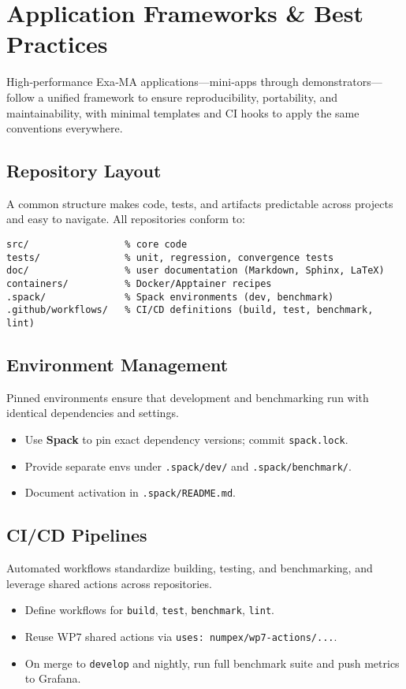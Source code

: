 
\section{Application Frameworks \& Best Practices}
\label{sec:apps-framework}

High‑performance Exa‑MA applications—mini‑apps through demonstrators—follow a unified framework to ensure reproducibility, portability, and maintainability, with minimal templates and CI hooks to apply the same conventions everywhere.

\subsection{Repository Layout}
A common structure makes code, tests, and artifacts predictable across projects and easy to navigate.
All repositories conform to:
\begin{verbatim}
src/                 % core code
tests/               % unit, regression, convergence tests
doc/                 % user documentation (Markdown, Sphinx, LaTeX)
containers/          % Docker/Apptainer recipes
.spack/              % Spack environments (dev, benchmark)
.github/workflows/   % CI/CD definitions (build, test, benchmark, lint)
\end{verbatim}

\subsection{Environment Management}
Pinned environments ensure that development and benchmarking run with identical dependencies and settings.
\begin{itemize}
  \item Use \textbf{Spack} to pin exact dependency versions; commit \texttt{spack.lock}.
  \item Provide separate envs under \texttt{.spack/dev/} and \texttt{.spack/benchmark/}.
  \item Document activation in \texttt{.spack/README.md}.
\end{itemize}

\subsection{CI/CD Pipelines}
Automated workflows standardize building, testing, and benchmarking, and leverage shared actions across repositories.
\begin{itemize}
  \item Define workflows for \texttt{build}, \texttt{test}, \texttt{benchmark}, \texttt{lint}.
  \item Reuse WP7 shared actions via \texttt{uses: numpex/wp7-actions/...}.
  \item On merge to \texttt{develop} and nightly, run full benchmark suite and push metrics to Grafana.
\end{itemize}

